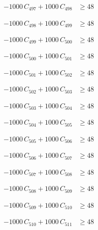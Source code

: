 \documentclass[a4paper,11pt]{article}
\begin{document}
\begin{align}
-1000\,C_{497} + 1000\,C_{498} &\geq 48 \nonumber
\end{align}

\begin{align}
-1000\,C_{498} + 1000\,C_{499} &\geq 48 \nonumber
\end{align}

\begin{align}
-1000\,C_{499} + 1000\,C_{500} &\geq 48 \nonumber
\end{align}

\begin{align}
-1000\,C_{500} + 1000\,C_{501} &\geq 48 \nonumber
\end{align}

\begin{align}
-1000\,C_{501} + 1000\,C_{502} &\geq 48 \nonumber
\end{align}

\begin{align}
-1000\,C_{502} + 1000\,C_{503} &\geq 48 \nonumber
\end{align}

\begin{align}
-1000\,C_{503} + 1000\,C_{504} &\geq 48 \nonumber
\end{align}

\begin{align}
-1000\,C_{504} + 1000\,C_{505} &\geq 48 \nonumber
\end{align}

\begin{align}
-1000\,C_{505} + 1000\,C_{506} &\geq 48 \nonumber
\end{align}

\begin{align}
-1000\,C_{506} + 1000\,C_{507} &\geq 48 \nonumber
\end{align}

\begin{align}
-1000\,C_{507} + 1000\,C_{508} &\geq 48 \nonumber
\end{align}

\begin{align}
-1000\,C_{508} + 1000\,C_{509} &\geq 48 \nonumber
\end{align}

\begin{align}
-1000\,C_{509} + 1000\,C_{510} &\geq 48 \nonumber
\end{align}

\begin{align}
-1000\,C_{510} + 1000\,C_{511} &\geq 48 \nonumber
\end{align}
\end{document}
